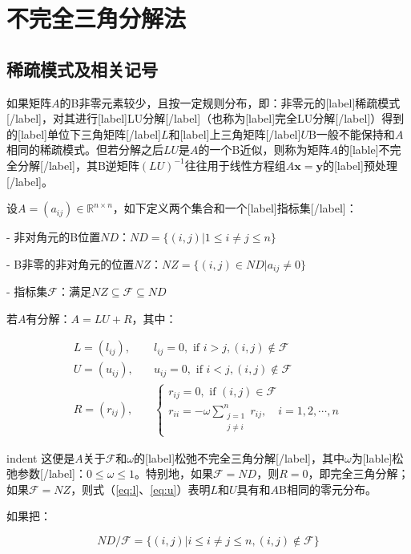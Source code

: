 \documentclass[UTF8,nofonts]{ctexart}
\begin{document}
\section*{不完全三角分解法}

\subsection*{稀疏模式及相关记号}

如果矩阵$A$的B非零元素较少，且按一定规则分布，即：非零元的[label]稀疏模式[/label]，对其进行[label]LU分解[/label]（也称为[label]完全LU分解[/label]）得到的[label]单位下三角矩阵[/label]$L$和[label]上三角矩阵[/label]$U$B一般不能保持和$A$相同的稀疏模式。但若分解之后$LU$是$A$的一个B近似，则称为矩阵$A$的[lable]不完全分解[/label]，其B逆矩阵$(LU)^{-1}$往往用于线性方程组$A\boldsymbol{x}=\boldsymbol{y}$的[label]预处理[/label]。

设$A=\left(a_{ij}\right)\in\mathbb{R}^{n \times n}$，如下定义两个集合和一个[label]指标集[/label]：

- 非对角元的B位置$ND$：$ND=\{(i,j)|1 \leq i \neq j \leq n\}$

- B非零的非对角元的位置$NZ$：$NZ=\{(i,j)\in ND|a_{ij}\neq 0\}$

- 指标集$\mathcal{F}$：满足$NZ \subseteq \mathcal{F} \subseteq ND$

若$A$有分解：$A=LU+R$，其中：

\begin{align}
\label{eq:l}
L=(l_{ij}),&\quad l_{ij}=0,\text{ if }i>j,(i,j)\notin\mathcal{F} \\
\label{eq:u}
U=(u_{ij}),&\quad u_{ij}=0,\text{ if }i<j,(i,j)\notin\mathcal{F} \\
\label{eq:r}
R=(r_{ij}),&\quad \begin{cases}r_{ij}=0,\text{ if }(i,j)\in\mathcal{F}\\r_{ii}=-\omega\displaystyle{\sum_{\substack{j=1\\j\neq i}}^n}r_{ij},\quad i=1,2,\cdots,n\end{cases}
\end{align}

indent 这便是$A$关于$\mathcal{F}$和$\omega$的[label]松弛不完全三角分解[/label]，其中$\omega$为[lable]松弛参数[/label]：$0 \leq \omega \leq 1$。特别地，如果$\mathcal{F}=ND$，则$R=0$，即完全三角分解；如果$\mathcal{F}=NZ$，则式（\ref{eq:l}、\ref{eq:u}）表明$L$和$U$具有和$A$B相同的零元分布。

如果把：

\[
ND/\mathcal{F}=\{(i,j)|i \leq i \neq j \leq n,(i,j)\notin\mathcal{F}\}
\]
\end{document}
